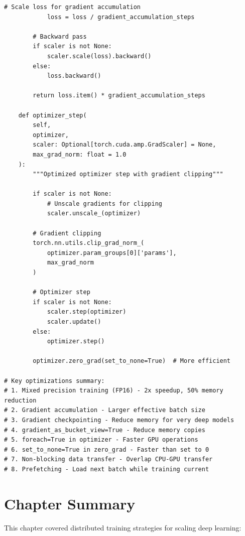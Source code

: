 \begin{lstlisting}[style=python, caption=Distributed Training Optimizations]
            # Scale loss for gradient accumulation
            loss = loss / gradient_accumulation_steps

        # Backward pass
        if scaler is not None:
            scaler.scale(loss).backward()
        else:
            loss.backward()

        return loss.item() * gradient_accumulation_steps

    def optimizer_step(
        self,
        optimizer,
        scaler: Optional[torch.cuda.amp.GradScaler] = None,
        max_grad_norm: float = 1.0
    ):
        """Optimized optimizer step with gradient clipping"""

        if scaler is not None:
            # Unscale gradients for clipping
            scaler.unscale_(optimizer)

        # Gradient clipping
        torch.nn.utils.clip_grad_norm_(
            optimizer.param_groups[0]['params'],
            max_grad_norm
        )

        # Optimizer step
        if scaler is not None:
            scaler.step(optimizer)
            scaler.update()
        else:
            optimizer.step()

        optimizer.zero_grad(set_to_none=True)  # More efficient

# Key optimizations summary:
# 1. Mixed precision training (FP16) - 2x speedup, 50% memory reduction
# 2. Gradient accumulation - Larger effective batch size
# 3. Gradient checkpointing - Reduce memory for very deep models
# 4. gradient_as_bucket_view=True - Reduce memory copies
# 5. foreach=True in optimizer - Faster GPU operations
# 6. set_to_none=True in zero_grad - Faster than set to 0
# 7. Non-blocking data transfer - Overlap CPU-GPU transfer
# 8. Prefetching - Load next batch while training current
\end{lstlisting}

\section{Chapter Summary}

This chapter covered distributed training strategies for scaling deep learning:

